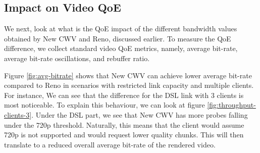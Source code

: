 \documentclass[10pt,sigconf]{acmart}
\begin{document}





\subsection{Impact on Video QoE}

We next, look at what is the QoE impact of the different bandwidth values obtained by New CWV and Reno, discussed earlier. To measure the QoE difference, we collect standard video QoE metrics, namely, average bit-rate, average bit-rate oscillations, and rebuffer ratio.

Figure \ref{fig:avg-bitrate} shows that New CWV can achieve lower average bit-rate compared to Reno in scenarios with restricted link capacity and multiple clients. For instance, We can see that the difference for the DSL link with 3 clients is most noticeable. To explain this behaviour, we can look at figure \ref{fig:throughput-clients-3}. Under the DSL part, we see that New CWV has more probes falling under the 720p threshold. Naturally, this means that the client would assume 720p is not supported and would request lower quality chunks. This will then translate to a reduced overall average bit-rate of the rendered video.
\end{document}
